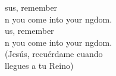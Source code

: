 \begin{cancion}%
	sus, remember \\
	n you come into your ngdom.\\
	us, remember \\
	n you come into your ngdom.\\
(Jesús, recuérdame cuando \\
 llegues a tu Reino)\\
\end{cancion}%
